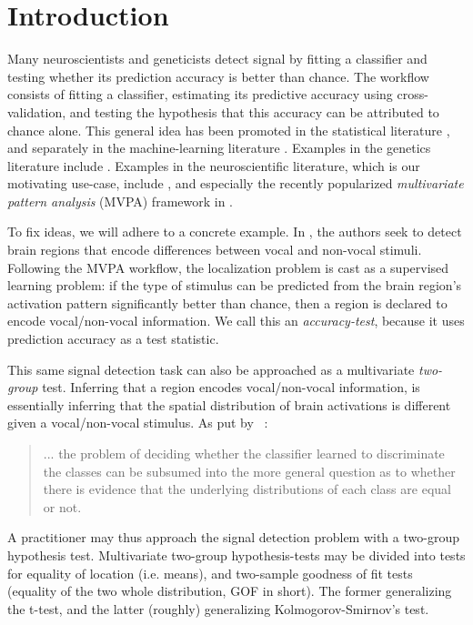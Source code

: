 \documentclass[oupdraft]{bio}
\begin{document}
\section{Introduction}
\label{sec:introduction}

Many neuroscientists and geneticists detect signal by fitting a classifier and testing whether its prediction accuracy is better than chance. 
The workflow consists of fitting a classifier, estimating its predictive accuracy using cross-validation, and testing the hypothesis that this accuracy can be attributed to chance alone. 
This general idea has been promoted in the statistical literature \citep{friedman2003multivariate}, and separately in the machine-learning literature \citep{eric2008testing,ojala_permutation_2010,lopez2016revisiting}.
Examples in the genetics literature include \cite{golub_molecular_1999,slonim_class_2000,radmacher_paradigm_2002,mukherjee_estimating_2003,juan_prediction_2004,jiang_calculating_2008,yu2007two}.
Examples in the neuroscientific literature, which is our motivating use-case, include \cite{golland_permutation_2003,pereira_machine_2009,schreiber2013statistical,olivetti2013kernel,varoquaux_assessing_2016}, and especially the recently popularized \emph{multivariate pattern analysis} (MVPA) framework in \cite{kriegeskorte_information-based_2006}.

To fix ideas, we will adhere to a concrete example.
In \cite{gilron_quantifying_2016}, the authors seek to detect brain regions that encode differences between vocal and non-vocal stimuli. 
Following the MVPA workflow, the localization problem is cast as a supervised learning problem: if the type of stimulus can be predicted from the brain region's activation pattern significantly better than chance, then a region is declared to encode vocal/non-vocal information. 
We call this an \emph{accuracy-test}, because it uses prediction accuracy as a test statistic. 

This same signal detection task can also be approached as a multivariate \emph{two-group} test.
Inferring that a region encodes vocal/non-vocal information, is essentially inferring that the spatial distribution of brain activations is different given a vocal/non-vocal stimulus. 
As put by ~\cite{pereira_machine_2009}: 
\begin{quote}
	... the problem of deciding whether the classifier learned to discriminate the classes can be subsumed into the more general question as to whether there is evidence that the underlying distributions of each class are equal or not.
\end{quote}
A practitioner may thus approach the signal detection problem with a two-group hypothesis test.
Multivariate two-group hypothesis-tests may be divided into tests for equality of location (i.e. means), and two-sample goodness of fit tests (equality of the two whole distribution, GOF in short).
The former generalizing the t-test, and the latter (roughly) generalizing Kolmogorov-Smirnov's test.
\end{document}
